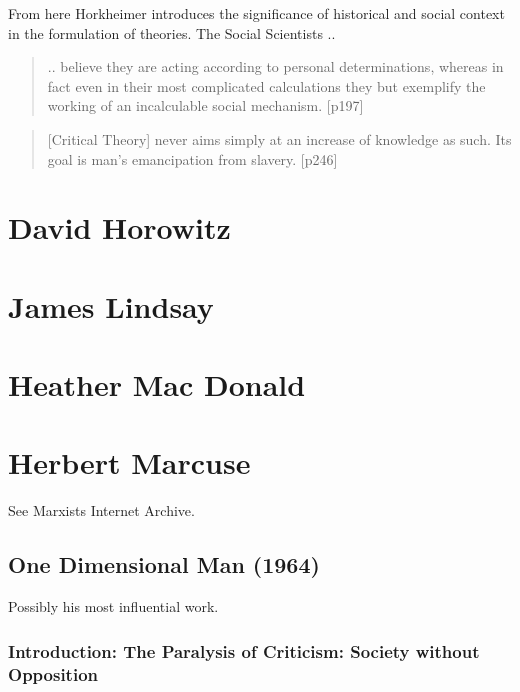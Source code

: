 \documentclass[10pt,titlepage]{book}
\begin{document}
From here Horkheimer introduces the significance of historical and social context in the formulation of theories.
The Social Scientists ..
\begin{quote}
.. believe they are acting according to personal
determinations, whereas in fact even in their most complicated
calculations they but exemplify the working of an incalculable
social mechanism. [p197]
\end{quote}

\begin{quote}
  [Critical Theory] never aims simply at an increase of knowledge as such. Its goal is man's emancipation from slavery. [p246]
\end{quote}


\section{David Horowitz}

\cite{horowitz-paau,horowitz-bbal}

\section{James Lindsay}

\cite{pluckrose-cynical,lindsay-everybody,pluckrose-cynical}

\section{Heather Mac Donald}

\cite{macdonald-bbi, macdonald-woc, macdonald-tdd}

\section{Herbert Marcuse}

See Marxists Internet Archive\cite{marcuse-mia}.

\subsection{One Dimensional Man (1964) \cite{marcuse-one-dim}}

Possibly his most influential work.

\subsubsection{Introduction: The Paralysis of Criticism: Society without Opposition}
\end{document}
